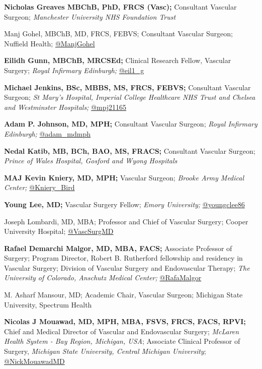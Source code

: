 \documentclass[
]{book}
\begin{document}
\textbf{Nicholas Greaves MBChB, PhD, FRCS (Vasc);} Consultant Vascular Surgeon; \emph{Manchester University NHS Foundation Trust}

Manj Gohel, MBChB, MD, FRCS, FEBVS; Consultant Vascular Surgeon; Nuffield Health; \href{https://twitter.com/manjgohel}{@ManjGohel}

\textbf{Eilidh Gunn, MBChB, MRCSEd;} Clinical Research Fellow, Vascular Surgery; \emph{Royal Infirmary Edinburgh;} \href{https://twitter.com/eil1_g}{@eil1\_g}

\textbf{Michael Jenkins, BSc, MBBS, MS, FRCS, FEBVS;} Consultant Vascular Surgeon; \emph{St Mary's Hospital, Imperial College Healthcare NHS Trust and Chelsea and Westminster Hospitals;} \href{https://mobile.twitter.com/mpj21165}{@mpj21165}

\textbf{Adam P. Johnson, MD, MPH;} Consultant Vascular Surgeon; \emph{Royal Infirmary Edinburgh;} \href{https://twitter.com/adam_mdmph?lang=en}{@adam\_mdmph}

\textbf{Nedal Katib, MB, BCh, BAO, MS, FRACS;} Consultant Vascular Surgeon; \emph{Prince of Wales Hospital, Gosford and Wyong Hospitals}

\textbf{MAJ Kevin Kniery, MD, MPH;} Vascular Surgeon; \emph{Brooke Army Medical Center;} \href{https://twitter.com/kniery_bird}{@Kniery\_Bird}

\textbf{Young Lee, MD;} Vascular Surgery Fellow; \emph{Emory University;} \href{https://twitter.com/youngclee86}{@youngclee86}

Joseph Lombardi, MD, MBA; Professor and Chief of Vascular Surgery; Cooper University Hospital; \href{https://twitter.com/vascsurgmd}{@VascSurgMD}

\textbf{Rafael Demarchi Malgor, MD, MBA, FACS;} Associate Professor of Surgery; Program Director, Robert B. Rutherford fellowship and residency in Vascular Surgery; Division of Vascular Surgery and Endovascular Therapy; \emph{The University of Colorado, Anschutz Medical Center;} \href{https://twitter.com/rafamalgor}{@RafaMalgor}

M. Asharf Mansour, MD; Academic Chair, Vascular Surgeon; Michigan State University, Spectrum Health

\textbf{Nicolas J Mouawad, MD, MPH, MBA, FSVS, FRCS, FACS, RPVI;} Chief and Medical Director of Vascular and Endovascular Surgery; \emph{McLaren Health System - Bay Region, Michigan, USA}; Associate Clinical Professor of Surgery, \emph{Michigan State University, Central Michigan University}; \href{https://twitter.com/nickmouawadmd?lang=en}{@NickMouawadMD}
\end{document}

